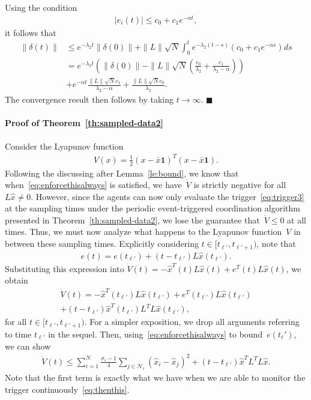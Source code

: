 \documentclass{autart}
\newcommand{\NN}{{\mathcal{N}}}
\newcommand{\TwoNorm}[1]{\|#1\|}
\renewcommand{\hat}{\widehat}
\begin{document}
{Using the condition
\begin{align*}
  | e_i(t) | \leq c_0 + c_1 e^{-\alpha t},
\end{align*}
it follows that
\begin{align*}
  \TwoNorm{\delta(t)} &\leq e^{-\lambda_2 t} \TwoNorm{\delta(0)} +
  \TwoNorm{L} \sqrt{N} \int_0^t e^{-\lambda_2(t-s)} (c_0 + c_1
  e^{-\alpha s}) ds
  \\
  &= e^{-\lambda_2 t} \left( \TwoNorm{\delta(0)} - \TwoNorm{L}
    \sqrt{N} \left( \frac{c_0}{\lambda_2} + \frac{c_1}{\lambda_2 -
        \alpha} \right) \right) \\ 
        &+ e^{-\alpha t} \frac{ \TwoNorm{L}
    \sqrt{N} c_1}{\lambda_2 - \alpha} + \frac{ \TwoNorm{L} \sqrt{N}
    c_0 }{\lambda_2}.
\end{align*}
The convergence result then follows by taking $t \rightarrow \infty$. 
\hfill $\blacksquare$


\paragraph*{\textbf{Proof of Theorem~\ref{th:sampled-data2}}}
Consider the Lyapunov function
\begin{align*}
  V(x) = \frac{1}{2}(x - \bar{x} \mathbf{1})^T ( x - \bar{x}
  \mathbf{1}).
\end{align*}
Following the discussing after Lemma~\ref{le:bound}, we know that
when~\eqref{eq:enforcethisalways} is satisfied, we have~$\dot{V}$ is
strictly negative for all~$L \hat{x} \neq 0$. However, since the
agents can now only evaluate the trigger~\eqref{eq:trigger3} at the
sampling times under the periodic event-triggered coordination
algorithm presented in Theorem~\ref{th:sampled-data2}, we lose the
guarantee that~$\dot{V} \leq 0$ at all times. Thus, we must now
analyze what happens to the Lyapunov function~$V$ in between these
sampling times. Explicitly considering $t \in [t_{\ell'},
t_{\ell'+1})$, note that
\begin{align*}
  e(t) = e(t_{\ell'}) + (t-t_{\ell'}) L \hat{x}(t_{\ell'}) .
\end{align*}
Substituting this expression into $\dot{V}(t) = -\hat{x}^T(t) L
\hat{x}(t) + e^T(t) L \hat{x}(t)$, we obtain
\begin{multline*}
  \dot{V}(t) = -\hat{x}^T(t_{\ell'}) L \hat{x}(t_{\ell'}) + e^T(t_{\ell'}) L
  \hat{x}(t_{\ell'})
  \\
  + (t - t_{\ell'}) \hat{x}^T(t_{\ell'}) L^T L \hat{x}(t_{\ell'}) ,
\end{multline*}
for all $t \in [t_{\ell'}, t_{\ell'+1})$.  For a simpler exposition,
we drop all arguments referring to time $t_{\ell'}$ in the sequel.
Then, using~\eqref{eq:enforcethisalways} to bound~$e(t_\ell')$, we
can show
\begin{align*}
  \dot{V}(t) \leq \sum_{i=1}^N \frac{\sigma_i - 1}{4} \sum_{j \in
    \NN_i} (\hat{x}_i - \hat{x}_j)^2 + (t-t_{\ell'})
  \hat{x}^T L^T L \hat{x} .
\end{align*}
Note that the first term is exactly what we have when we are able to
monitor the trigger continuously~\eqref{eq:thenthis}.

}
\end{document}
